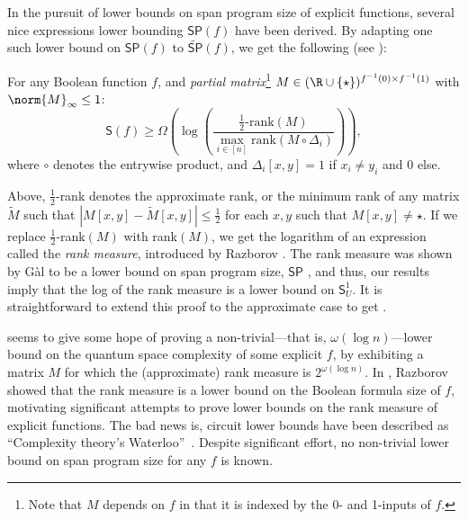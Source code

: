 \documentclass{toc}
\begin{document}
In the pursuit of lower bounds on span program size of
%
explicit  %
functions, several nice expressions lower bounding $\mathsf{SP}(f)$ have been derived.
By adapting one such lower bound on $\mathsf{SP}(f)$ to $\widetilde{\mathsf{SP}}(f)$, we get the following (see ):
\begin{theorem}[Informal]\label{thm:lb}
For any Boolean function $f$, and \emph{partial matrix}\footnote{Note that $M$ depends on $f$ in that it is indexed by the 0- and 1-inputs of $f$.} $M\in (\R\cup\{\star\})^{f^{-1}(0)\times f^{-1}(1)}$ with $\norm{M}_\infty\leq 1$:
$$\mathsf{S}(f)\geq \Omega\left(\log\left(\frac{\frac{1}{2}\mbox{-}\mathrm{rank}(M)}{\max_{i\in [n]}\mathrm{rank}(M\circ\Delta_i)}\right)\right),$$
where $\circ$ denotes the entrywise product, and $\Delta_i[x,y]=1$ if $x_i\neq y_i$ and 0 else.
\end{theorem}
Above, $\frac{1}{2}$-rank denotes the approximate rank, or the minimum rank of any matrix $\widetilde{M}$ such that $|M[{x,y}]-\widetilde{M}[{x,y}]|\leq \frac{1}{2}$ for each $x,y$ such that $M[x,y]\neq \star$. If we replace $\frac{1}{2}$-rank$(M)$ with rank$(M)$, we get the logarithm of an expression called the \emph{rank measure}, introduced by Razborov \cite{Raz90}. The rank measure was shown by G\`al to be a lower bound on span program size, $\mathsf{SP}$ \cite{Gal01}, and thus, our results imply that the log of the rank measure is a lower bound on $\mathsf{S}_U^1$. It is straightforward to extend this proof to the approximate case to get .

 seems to give some hope of proving a non-trivial---that is, $\omega(\log n)$---lower bound on the quantum space complexity of some explicit $f$, by exhibiting a matrix $M$ for which the (approximate) rank measure is $2^{\omega(\log n)}$.
In \cite{Raz90}, Razborov showed that the rank measure is a lower bound on the Boolean formula size of $f$, motivating significant attempts to prove lower bounds on the rank measure of explicit functions. The bad news is, circuit lower bounds have been described as ``Complexity theory's Waterloo''~\cite{AB09}. Despite significant effort, no non-trivial lower bound on span program size for any $f$ is known. 
\end{document}
